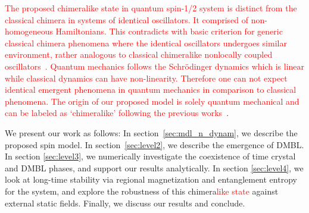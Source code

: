 \documentclass[12pt]{iopart}
\newcommand{\red}[1]{\textcolor{red}{#1}}
\begin{document}
\red{The proposed chimeralike state in quantum spin-1/2 system is distinct from the classical chimera in systems of identical oscillators. It comprised of non-homogeneous Hamiltonians. This contradicts with basic criterion for generic classical chimera phenomena where the identical oscillators undergoes similar environment, rather analogous to classical chimeralike nonlocally coupled oscillators~\cite{Jyoti2021,nkomo_chimera_2016}. Quantum mechanics follows the Schr\"{o}dinger dynamics which is linear while classical dynamics can have non-linearity. Therefore one can not expect identical emergent phenomena in quantum mechanics in comparison to classical phenomena. The origin of our proposed model is solely quantum mechanical and can be labeled as `chimeralike' following the previous works~\cite{Sakurai_Napolitano_2020, Jyoti2021}}. 

We present our work as follows: In section~\ref{sec:mdl_n_dynam}, we describe the proposed spin model. In section~\ref{sec:level2}, we describe the emergence of DMBL. In section \ref{sec:level3}, we numerically investigate the coexistence of time crystal and DMBL phases, and support our results analytically. In section \ref{sec:level4}, we look at long-time stability via regional magnetization and entanglement entropy for the system, and explore the robustness of this chimera\red{like state} against external static fields. Finally, we discuss our results and conclude.	
	
\end{document}
